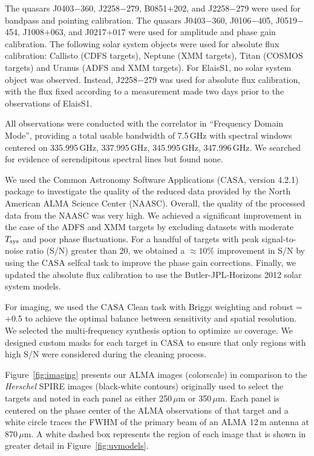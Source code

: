 \documentclass[iop]{emulateapj}
\begin{document}
The quasars J0403$-$360, J2258$-$279, B0851$+$202, and J2258$-$279 were used
for bandpass and pointing calibration.  The quasars J0403$-$360, J0106$-$405,
J0519$-$454, J1008$+$063, and J0217$+017$ were used for amplitude and phase
gain calibration.  The following solar system objects were used for absolute
flux calibration: Callisto (CDFS targets), Neptune (XMM targets), Titan (COSMOS
targets) and Uranus (ADFS and XMM targets).  For ElaisS1, no solar system
object was observed.  Instead, J2258$-$279 was used for absolute flux
calibration, with the flux fixed according to a measurement made two days prior
to the observations of ElaisS1.

All observations were conducted with the correlator in ``Frequency Domain
Mode'', providing a total usable bandwidth of 7.5$\,$GHz with spectral windows
centered on 335.995$\,$GHz, 337.995$\,$GHz, 345.995$\,$GHz, 347.996$\,$GHz.  We
searched for evidence of serendipitous spectral lines but found none.

We used the Common Astronomy Software Applications (CASA, version 4.2.1)
package to investigate the quality of the reduced data provided by the North
American ALMA Science Center (NAASC).  Overall, the quality of the processed
data from the NAASC was very high.  We achieved a significant improvement in
the case of the ADFS and XMM targets by excluding datasets with moderate
$T_{\rm sys}$ and poor phase fluctuations.  For a handful of targets with peak
signal-to-noise ratio (S/N) greater than 20, we obtained a $\approx 10\%$
improvement in S/N by using the CASA {\sc selfcal} task to improve the phase
gain corrections.  Finally, we updated the absolute flux calibration to use the
Butler-JPL-Horizons 2012 solar system models.

For imaging, we used the CASA {\sc Clean} task with Briggs weighting and robust
= $+$0.5 to achieve the optimal balance between sensitivity and spatial
resolution.  We selected the multi-frequency synthesis option to optimize {\it
uv} coverage.  We designed custom masks for each target in CASA to ensure that
only regions with high S/N were considered during the cleaning process.

Figure~\ref{fig:imaging} presents our ALMA images (colorscale) in comparison to
the {\it Herschel} SPIRE images (black-white contours) originally used to
select the targets and noted in each panel as either 250$\,\mu$m or
350$\,\mu$m.  Each panel is centered on the phase center of the ALMA
observations of that target and a white circle traces the FWHM of the primary
beam of an ALMA 12$\,$m antenna at 870$\,\mu$m.  A white dashed box represents
the region of each image that is shown in greater detail in
Figure~\ref{fig:uvmodels}.
\end{document}
